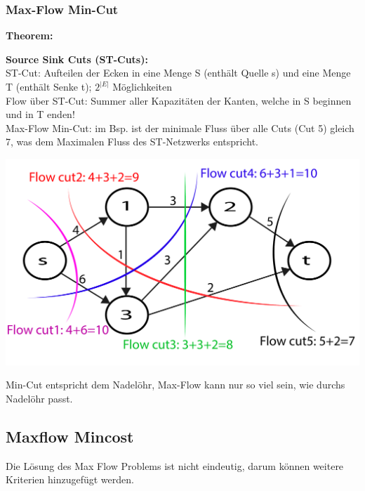 \subsubsection{Max-Flow Min-Cut}
\textbf{Theorem:} 

\begin{minipage}{0.6\textwidth}
	\textbf{Source Sink Cuts (ST-Cuts):}\\
	
	ST-Cut: Aufteilen der Ecken in eine Menge S (enthält Quelle s) und eine Menge T (enthält Senke t); $2^{|E|}$ Möglichkeiten\\
	
	Flow über ST-Cut: Summer aller Kapazitäten der Kanten, welche in S beginnen und in T enden!\\
	
	Max-Flow Min-Cut: im Bsp. ist der minimale Fluss über alle Cuts (Cut 5) gleich 7, was dem Maximalen Fluss des ST-Netzwerks entspricht.\\
	
\end{minipage}
\begin{minipage}{0.4\textwidth}
	\includegraphics[width=\textwidth]{Content/Graphen/StCuts.pdf}
\end{minipage}
Min-Cut entspricht dem Nadelöhr, Max-Flow kann nur so viel sein, wie durchs Nadelöhr passt. 

\subsection{Maxflow Mincost }
Die Lösung des Max Flow Problems ist nicht eindeutig, darum können weitere Kriterien hinzugefügt werden.\\

